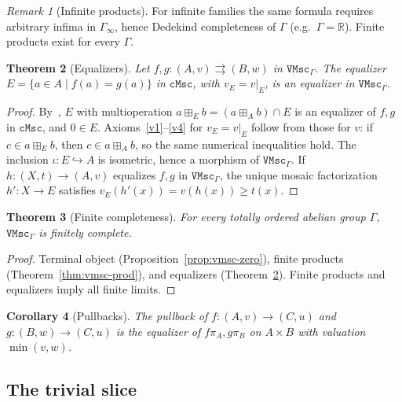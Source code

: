 \documentclass[11pt]{amsart}
\theoremstyle{plain}
\newtheorem{theorem}{Theorem}[section]
\newtheorem{corollary}[theorem]{Corollary}
\theoremstyle{definition}
\theoremstyle{remark}
\newtheorem{remark}[theorem]{Remark}
\newcommand{\cMsc}{\mathtt{cMsc}}
\newcommand{\VMscG}{\mathtt{VMsc}_{\Gamma}}
\begin{document}
\begin{remark}[Infinite products]
\label{rem:inf-prod}
For infinite families the same formula requires arbitrary infima in \(\Gamma_\infty\), hence Dedekind completeness of \(\Gamma\) (e.g.\ \(\Gamma=\mathbb{R}\)). Finite products exist for every \(\Gamma\).
\end{remark}

\begin{theorem}[Equalizers]
\label{thm:vmsc-eq}
Let \(f,g\colon(A,v)\rightrightarrows(B,w)\) in \(\VMscG\). The equalizer \(E=\{a\in A\mid f(a)=g(a)\}\) in \(\cMsc\), with \(v_E=v|_E\), is an equalizer in \(\VMscG\).
\end{theorem}

\begin{proof}
By~\cite{NR23}, \(E\) with multioperation \(a\boxplus_E b=(a\boxplus_A b)\cap E\) is an equalizer of \(f,g\) in \(\cMsc\), and \(0\in E\). Axioms~\eqref{v1}--\eqref{v4} for \(v_E=v|_E\) follow from those for \(v\): if \(c\in a\boxplus_E b\), then \(c\in a\boxplus_A b\), so the same numerical inequalities hold. The inclusion \(\iota\colon E\hookrightarrow A\) is isometric, hence a morphism of \(\VMscG\). If \(h\colon(X,t)\to(A,v)\) equalizes \(f,g\) in \(\VMscG\), the unique mosaic factorization \(h'\colon X\to E\) satisfies \(v_E(h'(x))=v(h(x))\ge t(x)\).
\end{proof}

\begin{theorem}[Finite completeness]
\label{thm:vmsc-finitely-complete}
For every totally ordered abelian group \(\Gamma\), \(\VMscG\) is finitely complete.
\end{theorem}

\begin{proof}
Terminal object (Proposition~\ref{prop:vmsc-zero}), finite products (Theorem~\ref{thm:vmsc-prod}), and equalizers (Theorem~\ref{thm:vmsc-eq}). Finite products and equalizers imply all finite limits.
\end{proof}

\begin{corollary}[Pullbacks]
\label{cor:vmsc-pullback}
The pullback of \(f\colon(A,v)\to(C,u)\) and \(g\colon(B,w)\to(C,u)\) is the equalizer of \(f\pi_A,g\pi_B\) on \(A\times B\) with valuation \(\min(v,w)\).
\end{corollary}


\subsection{The trivial slice}
\end{document}
